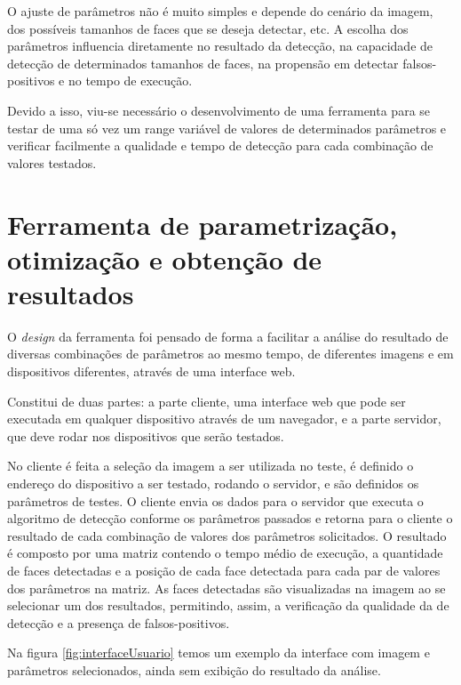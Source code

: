 O ajuste de parâmetros não é muito simples e depende do cenário da imagem, dos possíveis tamanhos de faces que se deseja detectar, etc. A escolha dos parâmetros influencia diretamente no resultado da detecção, na capacidade de detecção de determinados tamanhos de faces, na propensão em detectar falsos-positivos e no tempo de execução.

Devido a isso, viu-se necessário o desenvolvimento de uma ferramenta para se testar de uma só vez um range variável de valores de determinados parâmetros e verificar facilmente a qualidade e tempo de detecção para cada combinação de valores testados. 

\section{Ferramenta de parametrização, otimização e obtenção de resultados}

O \textit{design} da ferramenta foi pensado de forma a facilitar a análise do resultado de diversas combinações de parâmetros ao mesmo tempo, de diferentes imagens e em dispositivos diferentes, através de uma interface web.

Constitui de duas partes: a parte cliente, uma interface web que pode ser executada em qualquer dispositivo através de um navegador, e a parte servidor, que deve rodar nos dispositivos que serão testados.

No cliente é feita a seleção da imagem a ser utilizada no teste, é definido o endereço do dispositivo a ser testado, rodando o servidor, e são definidos os parâmetros de testes. O cliente envia os dados para o servidor que executa o algoritmo de detecção conforme os parâmetros passados e retorna para o cliente o resultado de cada combinação de valores dos parâmetros solicitados. O resultado é composto por uma matriz contendo o tempo médio de execução, a quantidade de faces detectadas e a posição de cada face detectada para cada par de valores dos parâmetros na matriz. As faces detectadas são visualizadas na imagem ao se selecionar um dos resultados, permitindo, assim, a verificação da qualidade da de detecção e a presença de falsos-positivos.

Na figura \ref{fig:interfaceUsuario} temos um exemplo da interface com imagem e parâmetros selecionados, ainda sem exibição do resultado da análise.

